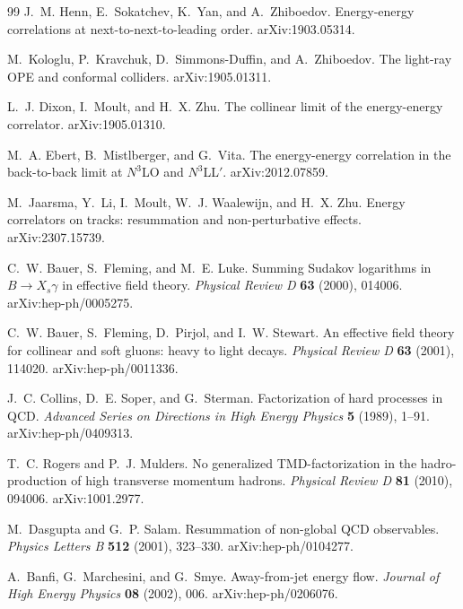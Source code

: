\begin{thebibliography}{99}
J.~M. Henn, E.~Sokatchev, K.~Yan, and A.~Zhiboedov.
Energy-energy correlations at next-to-next-to-leading order.
arXiv:1903.05314.

M.~Kologlu, P.~Kravchuk, D.~Simmons-Duffin, and A.~Zhiboedov.
The light-ray OPE and conformal colliders.
arXiv:1905.01311.

L.~J. Dixon, I.~Moult, and H.~X. Zhu.
The collinear limit of the energy-energy correlator.
arXiv:1905.01310.

M.~A. Ebert, B.~Mistlberger, and G.~Vita.
The energy-energy correlation in the back-to-back limit at
\(N^3\)LO and \(N^3\)LL\({}'\).
arXiv:2012.07859.

M.~Jaarsma, Y.~Li, I.~Moult, W.~J. Waalewijn, and H.~X. Zhu.
Energy correlators on tracks: resummation and non-perturbative effects.
arXiv:2307.15739.

C.~W. Bauer, S.~Fleming, and M.~E. Luke.
Summing Sudakov logarithms in \(B\to X_s\gamma\) in effective field theory.
\emph{Physical Review D} \textbf{63} (2000), 014006.
arXiv:hep-ph/0005275.

C.~W. Bauer, S.~Fleming, D.~Pirjol, and I.~W. Stewart.
An effective field theory for collinear and soft gluons: heavy to light decays.
\emph{Physical Review D} \textbf{63} (2001), 114020.
arXiv:hep-ph/0011336.

J.~C. Collins, D.~E. Soper, and G.~Sterman.
Factorization of hard processes in QCD.
\emph{Advanced Series on Directions in High Energy Physics} \textbf{5}
(1989), 1--91.
arXiv:hep-ph/0409313.

T.~C. Rogers and P.~J. Mulders.
No generalized TMD-factorization in the hadro-production of high transverse
momentum hadrons.
\emph{Physical Review D} \textbf{81} (2010), 094006.
arXiv:1001.2977.

M.~Dasgupta and G.~P. Salam.
Resummation of non-global QCD observables.
\emph{Physics Letters B} \textbf{512} (2001), 323--330.
arXiv:hep-ph/0104277.

A.~Banfi, G.~Marchesini, and G.~Smye.
Away-from-jet energy flow.
\emph{Journal of High Energy Physics} \textbf{08} (2002), 006.
arXiv:hep-ph/0206076.


\end{thebibliography}
